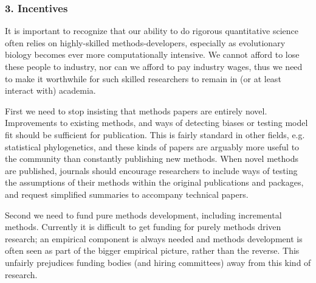 \documentclass[a4paper,12pt]{article}
\begin{document}

  \subsubsection{3. Incentives}
    It is important to recognize that our ability to do rigorous quantitative science often relies on highly-skilled methods-developers, especially as evolutionary biology becomes ever more computationally intensive. 
    We cannot afford to lose these people to industry, nor can we afford to pay industry wages, thus we need to make it worthwhile for such skilled researchers to remain in (or at least interact with) academia.

    First we need to stop insisting that methods papers are entirely novel. 
    Improvements to existing methods, and ways of detecting biases or testing model fit should be sufficient for publication.
    This is fairly standard in other fields, e.g. statistical phylogenetics, and these kinds of papers are arguably more useful to the community than constantly publishing new methods.
    When novel methods are published, journals should encourage researchers to include ways of testing the assumptions of their methods within the original publications and packages, and request simplified summaries to accompany technical papers.

    Second we need to fund pure methods development, including incremental methods. 
    Currently it is difficult to get funding for purely methods driven research; an empirical component is always needed and methods development is often seen as part of the bigger empirical picture, rather than the reverse. 
    This unfairly prejudices funding bodies (and hiring committees) away from this kind of research. 
\end{document}
